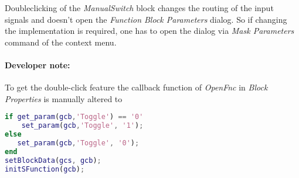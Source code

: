 Doubleclicking of the \textit{ManualSwitch} block changes the routing of the input signals and doesn't open the \textit{Function Block Parameters} dialog. So if changing the implementation is required, one has to open the dialog via \textit{Mask Parameters} command of the context menu.

\paragraph{Developer note:} To get the double-click feature the callback function of \textit{OpenFnc} in \textit{Block Properties} is manually altered to
\begin{lstlisting}[language=Matlab]
if get_param(gcb,'Toggle') == '0'
    set_param(gcb,'Toggle', '1');
else                             
   set_param(gcb,'Toggle', '0'); 
end                              
setBlockData(gcs, gcb);          
initSFunction(gcb); 
\end{lstlisting}